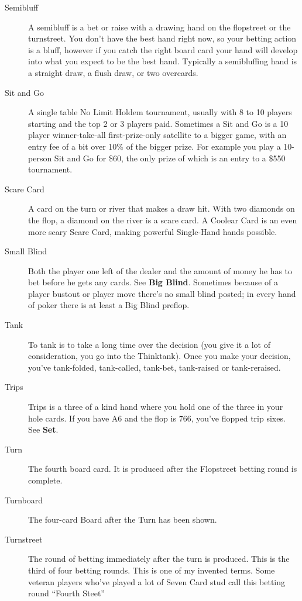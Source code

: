 \begin{description}
\item[Semibluff] A semibluff is a bet or raise with a drawing hand on
the flopstreet or the turnstreet. You don't have the best hand right
now, so your betting action is a bluff, however if you catch the right
board card your hand will develop into what you expect to be the best
hand. Typically a semibluffing hand is a straight draw, a flush draw,
or two overcards.

\item[Sit and Go] A single table No Limit Holdem tournament, usually
with 8 to 10 players starting and the top 2 or 3 players
paid. Sometimes a Sit and Go is a 10 player winner-take-all
first-prize-only satellite to a bigger game, with an entry fee of a
bit over 10\% of the bigger prize. For example you play a 10-person
Sit and Go for \$60, the only prize of which is an entry to a \$550
tournament.

\item[Scare Card] A card on the turn or river that makes a draw hit.
With two diamonds on the flop, a diamond on the river is a scare card.
A Coolear Card is an even more scary Scare Card, making powerful
Single-Hand hands possible.

\item[Small Blind] Both the player one left of the dealer and the
amount of money he has to bet before he gets any cards. See
\textbf{Big Blind}. Sometimes because of a player bustout or player
move there's no small blind posted; in every hand of poker there is at
least a Big Blind preflop.

\item[Tank] To tank is to take a long time over the decision
(you give it a lot of consideration, you go into the Thinktank).
Once you make your decision, you've tank-folded, tank-called, tank-bet,
tank-raised or tank-reraised.

\item[Trips] Trips is a three of a kind hand where you hold one of the
three in your hole cards. If you have A6 and the flop is 766, you've
flopped trip sixes. See \textbf{Set}.

\item[Turn] The fourth board card. It is produced after the Flopstreet
betting round is complete.

\item[Turnboard] The four-card Board after the Turn has been shown.

\item[Turnstreet] The round of betting immediately after the turn is
produced. This is the third of four betting rounds. This is one
of my invented terms. Some veteran players who've played a lot of
Seven Card stud call this betting round ``Fourth Steet''


\end{description}
